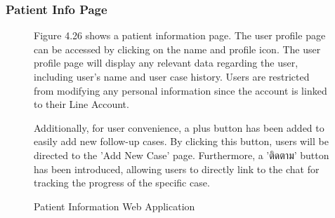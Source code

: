\documentclass[12pt,oneside,openright,a4paper]{cpe-english-project}
\begin{document}
        \subsubsection{Patient Info Page}
          \begin{figure}[!h]
            \centering
            \caption{Patient Information Web Application}\label{fig:WebAppPatientInfo}
            \begin{flushleft}
              \qquad Figure 4.26 shows a patient information page. The user profile page can be accessed by clicking on the name and profile icon. The user profile page will display any relevant data regarding the user, including user’s name and user case history. Users are restricted from modifying any personal information since the account is linked to their Line Account.\par
              \qquad Additionally, for user convenience, a plus button has been added to easily add new follow-up cases. By clicking this button, users will be directed to the 'Add New Case' page. Furthermore, a 'ติดตาม' button has been introduced, allowing users to directly link to the chat for tracking the progress of the specific case.\par
            \end{flushleft}       
          \end{figure}
\end{document}
